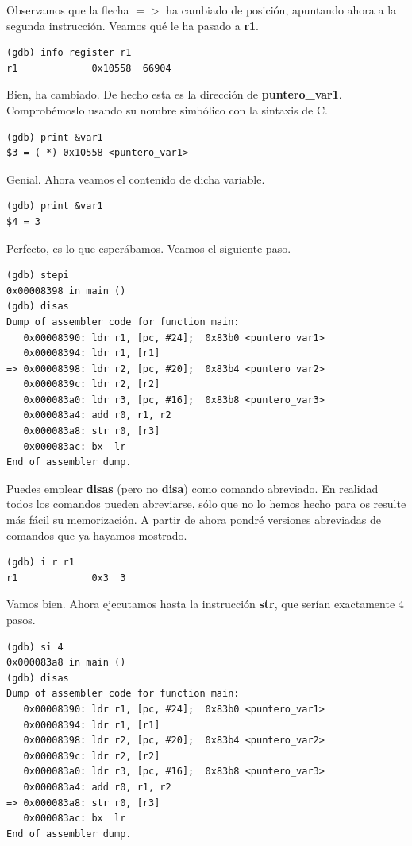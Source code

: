 Observamos que la flecha {\bf $=>$} ha cambiado de posición, apuntando ahora
a la segunda instrucción. Veamos qué le ha pasado a {\bf r1}.

\begin{lstlisting}
(gdb) info register r1
r1             0x10558  66904
\end{lstlisting}

Bien, ha cambiado. De hecho esta es la dirección de {\bf puntero\_var1}.
Comprobémoslo usando su nombre simbólico con la sintaxis de C.

\begin{lstlisting}
(gdb) print &var1
$3 = ( *) 0x10558 <puntero_var1>
\end{lstlisting}

Genial. Ahora veamos el contenido de dicha variable.

\begin{lstlisting}
(gdb) print &var1
$4 = 3
\end{lstlisting}

Perfecto, es lo que esperábamos. Veamos el siguiente paso.

\begin{lstlisting}
(gdb) stepi
0x00008398 in main ()
(gdb) disas
Dump of assembler code for function main:
   0x00008390: ldr r1, [pc, #24];  0x83b0 <puntero_var1>
   0x00008394: ldr r1, [r1]
=> 0x00008398: ldr r2, [pc, #20];  0x83b4 <puntero_var2>
   0x0000839c: ldr r2, [r2]
   0x000083a0: ldr r3, [pc, #16];  0x83b8 <puntero_var3>
   0x000083a4: add r0, r1, r2
   0x000083a8: str r0, [r3]
   0x000083ac: bx  lr
End of assembler dump.
\end{lstlisting}

Puedes emplear {\bf disas} (pero no {\bf disa}) como comando
abreviado. En realidad todos los comandos pueden abreviarse, sólo
que no lo hemos hecho para os resulte más fácil su memorización.
A partir de ahora pondré versiones abreviadas de comandos que ya
hayamos mostrado.

\begin{lstlisting}
(gdb) i r r1
r1             0x3  3
\end{lstlisting}

Vamos bien. Ahora ejecutamos hasta la instrucción {\bf str}, que
serían exactamente 4 pasos.

\begin{lstlisting}
(gdb) si 4
0x000083a8 in main ()
(gdb) disas
Dump of assembler code for function main:
   0x00008390: ldr r1, [pc, #24];  0x83b0 <puntero_var1>
   0x00008394: ldr r1, [r1]
   0x00008398: ldr r2, [pc, #20];  0x83b4 <puntero_var2>
   0x0000839c: ldr r2, [r2]
   0x000083a0: ldr r3, [pc, #16];  0x83b8 <puntero_var3>
   0x000083a4: add r0, r1, r2
=> 0x000083a8: str r0, [r3]
   0x000083ac: bx  lr
End of assembler dump.
\end{lstlisting}

